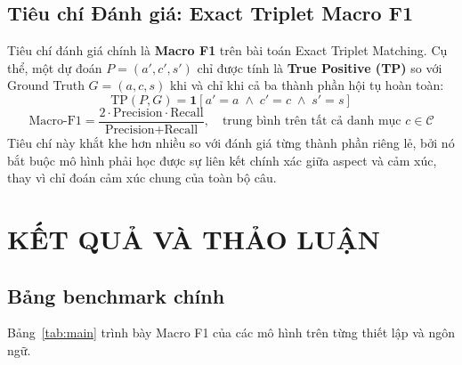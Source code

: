 \documentclass[12pt,a4paper,oneside]{report}
\begin{document}
\section{Tiêu chí Đánh giá: Exact Triplet Macro F1}

Tiêu chí đánh giá chính là \textbf{Macro F1} trên bài toán Exact Triplet Matching. Cụ thể, một dự đoán $P = (a', c', s')$ chỉ được tính là \textbf{True Positive (TP)} so với Ground Truth $G = (a, c, s)$ khi và chỉ khi cả ba thành phần hội tụ hoàn toàn:
\begin{equation}
    \text{TP}(P, G) = \mathbf{1}\left[a' = a \;\wedge\; c' = c \;\wedge\; s' = s\right]
\end{equation}
\begin{equation}
    \text{Macro-F1} = \frac{2 \cdot \text{Precision} \cdot \text{Recall}}{\text{Precision} + \text{Recall}}, \quad \text{trung bình trên tất cả danh mục } c \in \mathcal{C}
\end{equation}
Tiêu chí này khắt khe hơn nhiều so với đánh giá từng thành phần riêng lẻ, bởi nó bắt buộc mô hình phải học được sự liên kết chính xác giữa aspect và cảm xúc, thay vì chỉ đoán cảm xúc chung của toàn bộ câu.

\chapter{KẾT QUẢ VÀ THẢO LUẬN}
\section{Bảng benchmark chính}
Bảng~\ref{tab:main} trình bày Macro F1 của các mô hình trên từng thiết lập và ngôn ngữ.
\end{document}
